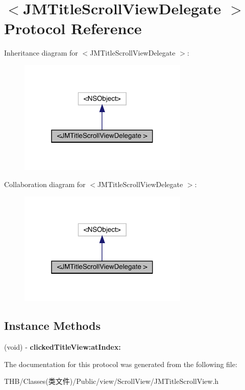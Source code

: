 \hypertarget{protocol_j_m_title_scroll_view_delegate_01-p}{}\section{$<$J\+M\+Title\+Scroll\+View\+Delegate $>$ Protocol Reference}
\label{protocol_j_m_title_scroll_view_delegate_01-p}


Inheritance diagram for $<$J\+M\+Title\+Scroll\+View\+Delegate $>$\+:\nopagebreak
\begin{figure}[H]
\begin{center}
\leavevmode
\includegraphics[width=229pt]{protocol_j_m_title_scroll_view_delegate_01-p__inherit__graph}
\end{center}
\end{figure}


Collaboration diagram for $<$J\+M\+Title\+Scroll\+View\+Delegate $>$\+:\nopagebreak
\begin{figure}[H]
\begin{center}
\leavevmode
\includegraphics[width=229pt]{protocol_j_m_title_scroll_view_delegate_01-p__coll__graph}
\end{center}
\end{figure}
\subsection*{Instance Methods}
\begin{DoxyCompactItemize}
\item 
\mbox{\label{protocol_j_m_title_scroll_view_delegate_01-p_a0b610bd64e18219270480d34ac4114b2}} 
(void) -\/ {\bfseries clicked\+Title\+View\+:at\+Index\+:}
\end{DoxyCompactItemize}


The documentation for this protocol was generated from the following file\+:\begin{DoxyCompactItemize}
\item 
T\+H\+B/\+Classes(类文件)/\+Public/view/\+Scroll\+View/J\+M\+Title\+Scroll\+View.\+h\end{DoxyCompactItemize}
